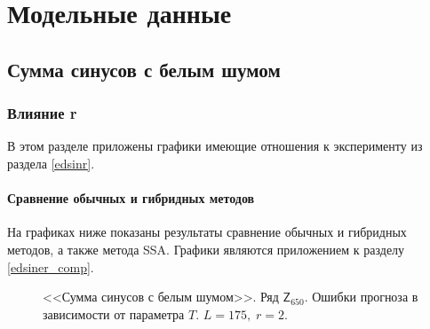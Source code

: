 \documentclass[specialist,
               substylefile = spbu.rtx,
               subf,href,colorlinks=true, 12p]{disser}
\begin{document}



\appendix

\chapter{Модельные данные}
\section{Сумма синусов с белым шумом}

\subsection{Влияние r}

В этом разделе приложены графики имеющие отношения к эксперименту из раздела \ref{edsinr}.

\subsubsection{Сравнение обычных и гибридных методов}
\label{aedsiner_comp}
На графиках ниже показаны результаты сравнение обычных и гибридных методов, а также метода SSA. Графики являются приложением к разделу \ref{edsiner_comp}.

\begin{figure}[H]
	\captionsetup{justification=centering}
	\caption{<<Сумма синусов с белым шумом>>. Ряд $\mathsf{Z}_{650}$. Ошибки прогноза в зависимости от параметра $T$. $L = 175, \; r = 2$.}
\end{figure}
\end{document}
